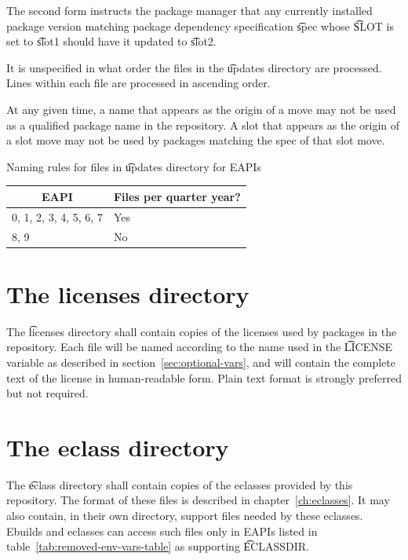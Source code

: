 The second form instructs the package manager that any currently installed package version matching
package dependency specification \t{spec} whose \t{SLOT} is set to \t{slot1} should have it updated
to \t{slot2}.

It is unspecified in what order the files in the \t{updates} directory are processed. Lines within
each file are processed in ascending order.

At any given time, a name that appears as the origin of a move may not be used as a qualified
package name in the repository. A slot that appears as the origin of a slot move may not be used
by packages matching the spec of that slot move.

\begin{centertable}{Naming rules for files in \t{updates} directory for EAPIs}
    \label{tab:updates-filenames}
    \begin{tabular}{ll}
      \toprule
      \multicolumn{1}{c}{\textbf{EAPI}} &
      \multicolumn{1}{c}{\textbf{Files per quarter year?}} \\
      \midrule
      0, 1, 2, 3, 4, 5, 6, 7  & Yes \\
      8, 9                    & No  \\
      \bottomrule
    \end{tabular}
\end{centertable}

\section{The licenses directory}
\label{sec:licenses-dir}

The \t{licenses} directory shall contain copies of the licenses used by packages in the
repository. Each file will be named according to the name used in the \t{LICENSE} variable as
described in section~\ref{sec:optional-vars}, and will contain the complete text of the license in
human-readable form. Plain text format is strongly preferred but not required.

\section{The eclass directory}
\label{sec:eclass-dir}

The \t{eclass} directory shall contain copies of the eclasses provided by this repository. The
format of these files is described in chapter~\ref{ch:eclasses}. It may also contain, in their own
directory, support files needed by these eclasses. Ebuilds and eclasses can access such files only
in EAPIs listed in table~\ref{tab:removed-env-vars-table} as supporting \t{ECLASSDIR}.


